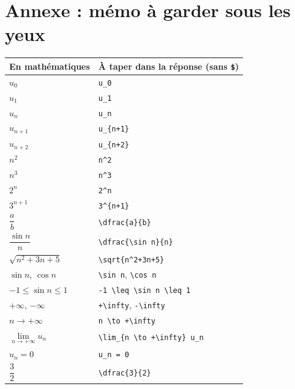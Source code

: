 \documentclass[11pt,a4paper]{article}
\begin{document}
\section{Annexe : mémo à garder sous les yeux}

\begin{retenir}
\begin{center}
\footnotesize
\renewcommand{\arraystretch}{1.3}
\begin{tabular}{ll}
\toprule
\textbf{En mathématiques} & \textbf{À taper dans la réponse (sans \texttt{\$})} \\
\midrule
\(u_0\)                  & \verb|u_0| \\
\(u_1\)                  & \verb|u_1| \\
\(u_n\)                  & \verb|u_n| \\
\(u_{n+1}\)              & \verb|u_{n+1}| \\
\(u_{n+2}\)              & \verb|u_{n+2}| \\
\(n^2\)                  & \verb|n^2| \\
\(n^3\)                  & \verb|n^3| \\
\(2^n\)                  & \verb|2^n| \\
\(3^{n+1}\)              & \verb|3^{n+1}| \\
\(\dfrac{a}{b}\)         & \verb|\dfrac{a}{b}| \\
\(\dfrac{\sin n}{n}\)    & \verb|\dfrac{\sin n}{n}| \\
\(\sqrt{n^2+3n+5}\)      & \verb|\sqrt{n^2+3n+5}| \\
\(\sin n\), \(\cos n\)   & \verb|\sin n|, \verb|\cos n| \\
\(-1 \leq \sin n \leq 1\) & \verb|-1 \leq \sin n \leq 1| \\
\(+\infty\), \(-\infty\) & \verb|+\infty|, \verb|-\infty| \\
\(n \to +\infty\)        & \verb|n \to +\infty| \\
\(\lim\limits_{n\to+\infty} u_n\) & \verb|\lim_{n \to +\infty} u_n| \\
\(u_n = 0\)              & \verb|u_n = 0| \\
\(\dfrac{3}{2}\)         & \verb|\dfrac{3}{2}| \\
\bottomrule
\end{tabular}
\end{center}
\end{retenir}
\end{document}
